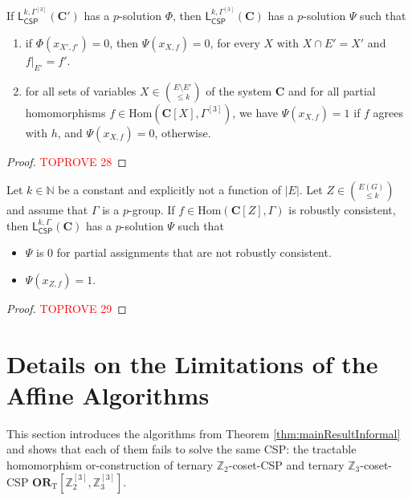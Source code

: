 \documentclass[a4paper,english, thm-restate]{lipics-v2021}
\newcommand{\ZZ}{\mathbb{Z}}
\newcommand{\StructC}{\mathbf{C}}
\newcommand{\Hom}[2]{\mathrm{Hom}(#1,#2)}
\newcommand{\leqs}{\mathsf{L}}
\newcommand{\cspiso}[3]{\leqs^{#1,#2}_{\mathsf{CSP}}(#3)}
\newcommand{\bbN}{\mathbb{N}}
\newcommand{\CosetGrpTmplt}[2]{#1^{[#2]}}
\newcommand{\ORT}[1]{\mathbf{OR}_\text{T}[#1]}
\begin{document}
	
	
	
	\begin{lemma}
		\label{lem:piecingTogetherPhiAndSolution}
		If $\cspiso{k}{\CosetGrpTmplt{\Gamma}{3}}{\StructC'}$ has a $p$-solution $\Phi$, then $\cspiso{k}{\CosetGrpTmplt{\Gamma}{3}}{\StructC}$ has a $p$-solution $\Psi$ such that
		\begin{enumerate}
			\item if $\Phi(x_{X',f'}) = 0$, then $\Psi(x_{X,f}) = 0$, for every $X$ with $X \cap E' = X'$ and $f|_{E'} = f'$.
			\item  for all sets of variables $X \in \binom{E \setminus E'}{\leq k}$ of the system $\StructC$ and for all partial homomorphisms $f \in \Hom{\StructC[X]}{\CosetGrpTmplt{\Gamma}{3}}$,
			we have $\Psi(x_{X,f}) = 1$ if $f$ agrees with $h$, and $\Psi(x_{X,f}) = 0$, otherwise.
		\end{enumerate}
	\end{lemma}	
	\begin{proof}\textcolor{red}{TOPROVE 28}\end{proof}	
	
	
	
	\begin{corollary}
		\label{cor:group-csp-p-solution-with-fixed-assignment}
		Let $k \in \bbN$ be a constant and explicitly not a function of $|E|$.
		Let $Z \in \binom{E(G)}{\leq k}$ and assume that $\Gamma$ is a $p$-group.
		If $f \in \Hom{\StructC[Z]}{\Gamma}$ is robustly consistent, then $\cspiso{k}{\Gamma}{\StructC}$ has a $p$-solution $\Psi$ such that
		\begin{itemize}
			\item $\Psi$ is $0$ for partial assignments that are not robustly consistent.
			\item $\Psi(x_{Z,f}) = 1$.
		\end{itemize}
	\end{corollary}
	\begin{proof}\textcolor{red}{TOPROVE 29}\end{proof}	
	
	
	
	
	
	
	
	
	\section{Details on the Limitations of the Affine Algorithms}
	\label{app:power-of-affine}
	
	This section introduces the algorithms from Theorem \ref{thm:mainResultInformal}
	and shows that each of them fails to solve the same CSP:
	the tractable homomorphism or-construction
	of ternary $\ZZ_2$-coset-CSP and  ternary $\ZZ_3$-coset-CSP
	$\ORT{\CosetGrpTmplt{\ZZ_2}{3}, \CosetGrpTmplt{\ZZ_3}{3}}$.
	
\end{document}
